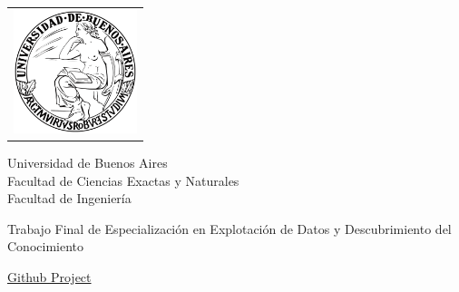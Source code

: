 \newcommand{\HRule}{\rule{\linewidth}{0.2mm}}
%
\thispagestyle{empty}

\begin{center}\leavevmode

\vspace{-2cm}

\begin{tabular}{l}
\includegraphics[width=3.6cm]{./images/logouba.png}
\end{tabular}


{\large \sc Universidad de Buenos Aires\\Facultad de Ciencias Exactas y Naturales \\ Facultad de Ingeniería}

\vspace{6.0cm}

\vspace{3.0cm}

\begin{huge}
\textbf{\tituloTesis}
\end{huge}

\vspace{2cm}

{\large Trabajo Final de Especialización en Explotación de Datos y Descubrimiento del Conocimiento}
\vspace{2cm}

{\large \href{https://github.com/adrianmarino/thesis-paper}{Github Project} }

\vspace{2cm}

{\Large \autor}

\end{center}

\vfill

{\large


\vspace{.2cm}


\vspace{.2cm}

\lugar
}

\newpage\thispagestyle{empty}
